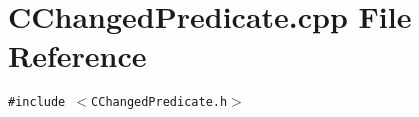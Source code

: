 \section{CChanged\-Predicate.cpp File Reference}
\label{CChangedPredicate_8cpp}
{\tt \#include $<$CChanged\-Predicate.h$>$}\par
